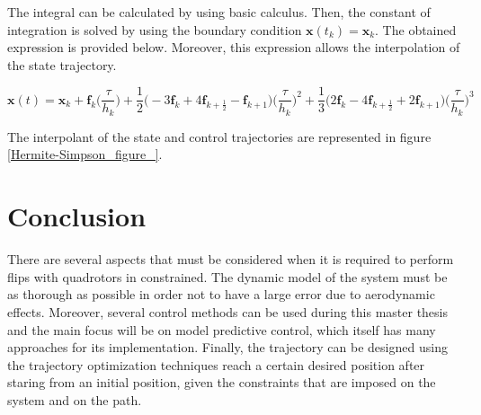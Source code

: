 \documentclass{thesisreport}
\begin{document}
The integral can be calculated by using basic calculus. Then, the constant of integration is solved by using the boundary condition $\bm{x}(t_k) = \bm{x}_k$. The obtained expression is provided below. Moreover, this expression allows the interpolation of the state trajectory.

\begin{equation}
	\bm{x}(t)= \bm{x}_k + \bm{f}_k \bigg(\frac{\tau}{h_k}\bigg) +\frac{1}{2}\bigg(-3 \bm{f}_k + 4 \bm{f}_{k+\frac{1}{2}} - \bm{f}_{k+1}\bigg) \bigg(\frac{\tau}{h_k}\bigg)^2 + \frac{1}{3} \bigg(2 \bm{f}_k -4\bm{f}_{k+ \frac{1}{2}} + 2 \bm{f}_{k+1} \bigg) \bigg(\frac{\tau}{h_k}\bigg)^3
\end{equation}

The interpolant of the state and control trajectories are represented in figure \ref{Hermite-Simpson_figure_}.

\newpage 
 
 \chapter*{Conclusion}
 
 There are several aspects that must be considered when it is required to perform flips with quadrotors in constrained. The dynamic model of the system must be as thorough as possible in order not to have a large error due to aerodynamic effects. Moreover, several control methods can be used during this master thesis and the main focus will be on model predictive control, which itself has many approaches for its implementation.  
 Finally, the trajectory can be designed using the trajectory optimization techniques reach a certain desired position after staring from an initial position, given the constraints that are imposed on the system and on the path.  
 
 


 \nocite{*}
 
 


 
\end{document}

